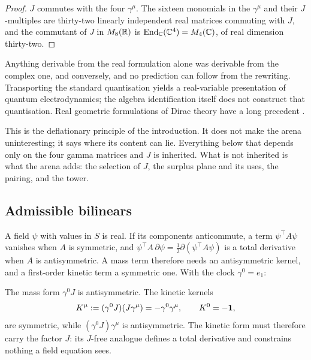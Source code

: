 \begin{proof}
$J$ commutes with the four $\gamma^\mu$. The sixteen monomials in the $\gamma^\mu$ and their $J$-multiples are thirty-two
linearly independent real matrices commuting with $J$, and the commutant of $J$ in $M_8(\mathbb{R})$ is $\operatorname{End}_{\mathbb{C}}(\mathbb{C}^4)=M_4(\mathbb{C})$, of real
dimension thirty-two.
\end{proof}

\begin{corollary}
\label{cor:nopredict}
Anything derivable from the real formulation alone was derivable from the complex one, and conversely, and no prediction can follow
from the rewriting. Transporting the standard quantisation yields a real-variable presentation of quantum electrodynamics; the algebra
identification itself does not construct that quantisation. Real geometric formulations of Dirac theory have a long precedent \cite{Hestenes67}.
\end{corollary}

This is the deflationary principle of the introduction. It does not make the arena uninteresting; it says where its content can
lie. Everything below that depends only on the four gamma matrices and $J$ is inherited. What is not inherited is what the arena
adds: the selection of $J$, the surplus plane and its uses, the pairing, and the tower.

\subsection{Admissible bilinears}

A field $\psi$ with values in $S$ is real. If its components anticommute, a term $\psi^{\!\top}A\psi$ vanishes when $A$ is
symmetric, and $\psi^{\!\top}A\,\partial\psi=\tfrac12\partial(\psi^{\!\top}A\psi)$ is a total derivative when $A$ is antisymmetric. A
mass term therefore needs an antisymmetric kernel, and a first-order kinetic term a symmetric one. With the clock $\gamma^0=e_1$:

\begin{proposition}
\label{prop:kernels1}
The mass form $\gamma^0J$ is antisymmetric. The kinetic kernels
\[
K^\mu:=(\gamma^0J)(J\gamma^\mu)=-\gamma^0\gamma^\mu,\qquad K^0=-\mathbf 1,
\]
are symmetric, while $(\gamma^0J)\gamma^\mu$ is antisymmetric. The kinetic form must therefore carry the factor $J$: its $J$-free analogue
defines a total derivative and constrains nothing a field equation sees.
\end{proposition}

